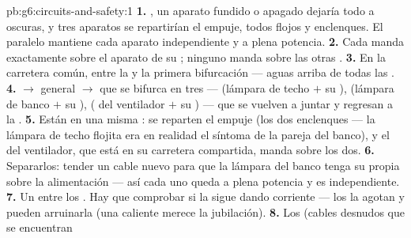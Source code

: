 \begin{solution}{pb:g6:circuits-and-safety:1}
\textbf{1.} , un aparato fundido o apagado dejaría todo a
oscuras, y tres aparatos se repartirían el empuje, todos flojos y
enclenques. El paralelo mantiene cada aparato independiente y a plena
potencia.
\textbf{2.} Cada  manda exactamente sobre el aparato de
su ; ninguno manda sobre las otras .
\textbf{3.} En la carretera común, entre la  y la primera
bifurcación --- aguas arriba de todas las .
\textbf{4.}  $\to$  general $\to$  que
se bifurca en tres  --- (lámpara de techo $+$ su
), (lámpara de banco $+$ su ),
( del ventilador $+$ su ) --- que se vuelven
a juntar y regresan a la .
\textbf{5.} Están  en una misma : se reparten el
empuje (los dos enclenques --- la lámpara de techo flojita era en
realidad el síntoma de la pareja del banco), y el 
del ventilador, que está en su carretera compartida, manda sobre los
dos.
\textbf{6.} Separarlos: tender un cable nuevo para que la lámpara del
banco tenga su propia  sobre la alimentación --- así cada uno
queda a plena potencia y es independiente.
\textbf{7.} Un  entre los . Hay que
comprobar si la  sigue dando corriente --- los 
la agotan y pueden arruinarla (una  caliente merece la
jubilación).
\textbf{8.} Los  (cables desnudos que se encuentran

\end{solution}
